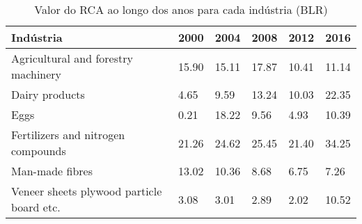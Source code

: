\begin{table}
\centering
\caption{Valor do RCA ao longo dos anos para cada indústria (BLR)}
\label{tab:ex3-tempo-BLR}
\begin{tabular}{p{6cm}p{1.5cm}p{1.5cm}p{1.5cm}p{1.5cm}p{1.5cm}}
\toprule
                                Indústria &  2000 &  2004 &  2008 &  2012 &  2016 \\
\midrule
      Agricultural and forestry machinery & 15.90 & 15.11 & 17.87 & 10.41 & 11.14 \\
                           Dairy products &  4.65 &  9.59 & 13.24 & 10.03 & 22.35 \\
                                     Eggs &  0.21 & 18.22 &  9.56 &  4.93 & 10.39 \\
       Fertilizers and nitrogen compounds & 21.26 & 24.62 & 25.45 & 21.40 & 34.25 \\
                          Man-made fibres & 13.02 & 10.36 &  8.68 &  6.75 &  7.26 \\
Veneer sheets plywood particle board etc. &  3.08 &  3.01 &  2.89 &  2.02 & 10.52 \\
\bottomrule
\end{tabular}
\end{table}
